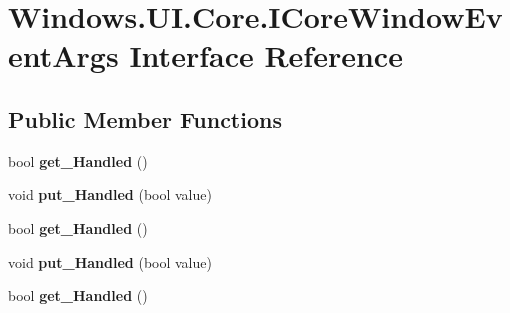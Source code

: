 \hypertarget{interface_windows_1_1_u_i_1_1_core_1_1_i_core_window_event_args}{}\section{Windows.\+U\+I.\+Core.\+I\+Core\+Window\+Event\+Args Interface Reference}
\label{interface_windows_1_1_u_i_1_1_core_1_1_i_core_window_event_args}
\subsection*{Public Member Functions}
\begin{DoxyCompactItemize}
\item 
\mbox{\label{interface_windows_1_1_u_i_1_1_core_1_1_i_core_window_event_args_a03b6ec31318cc38a7f708e7b3d080823}} 
bool {\bfseries get\+\_\+\+Handled} ()
\item 
\mbox{\label{interface_windows_1_1_u_i_1_1_core_1_1_i_core_window_event_args_ab296e2b8efbf657f47ebc4dd2d0e9753}} 
void {\bfseries put\+\_\+\+Handled} (bool value)
\item 
\mbox{\label{interface_windows_1_1_u_i_1_1_core_1_1_i_core_window_event_args_a03b6ec31318cc38a7f708e7b3d080823}} 
bool {\bfseries get\+\_\+\+Handled} ()
\item 
\mbox{\label{interface_windows_1_1_u_i_1_1_core_1_1_i_core_window_event_args_ab296e2b8efbf657f47ebc4dd2d0e9753}} 
void {\bfseries put\+\_\+\+Handled} (bool value)
\item 
\mbox{\label{interface_windows_1_1_u_i_1_1_core_1_1_i_core_window_event_args_a03b6ec31318cc38a7f708e7b3d080823}} 
bool {\bfseries get\+\_\+\+Handled} ()
\item 
\mbox{\label{interface_windows_1_1_u_i_1_1_core_1_1_i_core_window_event_args_ab296e2b8efbf657f47ebc4dd2d0e9753}} 

\end{DoxyCompactItemize}
